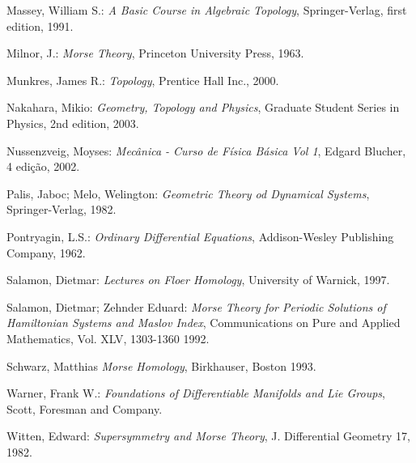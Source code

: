 \documentclass[12pt]{book}
\begin{document}
\begin{thebibliography}{9}
		Massey, William S.:
		\emph{A Basic Course in Algebraic Topology},
		Springer-Verlag, first edition,
		1991.
		
		Milnor, J.:
		\emph{Morse Theory},
		Princeton University Press, 1963.

		Munkres, James R.:
		\emph{Topology},
		Prentice Hall Inc., 2000.
				
		Nakahara, Mikio:
		\emph{Geometry, Topology and Physics},
		Graduate Student Series in Physics, 2nd edition,
		2003.
		
		Nussenzveig, Moyses:
		\emph{Mecânica - Curso de Física Básica Vol 1},
		Edgard Blucher, 4 edição,
		2002.
		
		Palis, Jaboc; Melo, Welington:
		\emph{Geometric Theory od Dynamical Systems},
		Springer-Verlag,
		1982.
		
		Pontryagin, L.S.:
		\emph{Ordinary Differential Equations},
		Addison-Wesley Publishing Company,
		1962.
		
		Salamon, Dietmar:
		\emph{Lectures on Floer Homology},
		University of Warnick,
		1997.

		Salamon, Dietmar; Zehnder Eduard:
		\emph{Morse Theory for Periodic Solutions of Hamiltonian Systems and Maslov Index},
		Communications on Pure and Applied Mathematics, Vol. XLV, 1303-1360
		1992.
		
		Schwarz, Matthias
		\emph{Morse Homology},
		Birkhauser, Boston
		1993.
		
		Warner, Frank W.:
		\emph{Foundations of Differentiable Manifolds and Lie Groups},
		Scott, Foresman and Company.
			
		Witten, Edward:
		\emph{Supersymmetry and Morse Theory},
		J. Differential Geometry 17,
		1982.
	\end{thebibliography}
	
\end{document}
